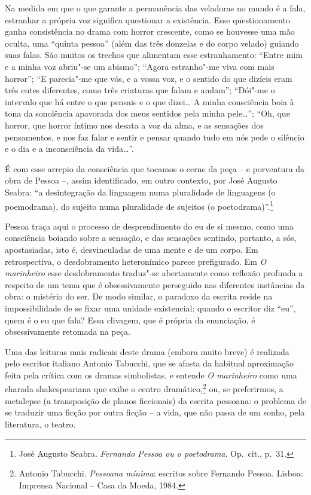 Na medida em que o que garante a 
permanência das veladoras no mundo é a
fala, estranhar a própria voz significa
questionar a existência. Esse
questionamento ganha consistência no
drama com horror crescente, como
se houvesse uma mão oculta, uma “quinta pessoa”
(além das três donzelas
e do corpo velado) guiando suas falas. 
São muitos os trechos que
alimentam esse estranhamento: 
“Entre mim e a minha voz abriu"-se um
abismo”; “Agora estranho"-me viva com
mais horror”; “E parecia"-me que
vós, e a vossa voz, e o sentido do que 
dizíeis eram três entes
diferentes, como três criaturas que
falam e andam”; “Dói"-me o intervalo
que há entre o que pensais e o que
dizei\ldots{} A minha consciência boia à
tona da sonolência apavorada dos meus 
sentidos pela minha pele\ldots{}”;
“Oh, que horror, que horror íntimo nos desata a voz da alma, e as
sensações dos pensamentos, e nos
faz falar e sentir e pensar quando
tudo em nós pede o silêncio e o dia
e a inconsciência da vida\ldots{}”. 

É com esse arrepio da consciência que tocamos 
o cerne da peça -- e
porventura da obra de Pessoa --, assim 
identificado, em outro contexto,
por José Augusto Seabra: “a desintegração
da linguagem numa pluralidade
de linguagens (o poemodrama), do sujeito
numa pluralidade de sujeitos
(o poetodrama)”.\footnote{ 
José Augusto Seabra. \textit{Fernando Pessoa
ou o poetodrama}. Op.~cit., p.~31.} 

Pessoa traça aqui o processo de desprendimento do eu de si mesmo, como
uma consciência boiando sobre a sensação, e das sensações sentindo,
portanto, a sós, apostasiadas, isto é, desvinculadas de uma mente e de
um corpo. Em retrospectiva, o desdobramento heteronímico parece
prefigurado. Em \textit{O marinheiro} esse desdobramento traduz"-se
abertamente como reflexão profunda a respeito de um tema que é
obsessivamente perseguido nas diferentes instâncias da obra: o mistério
do ser. De modo similar, o paradoxo da escrita reside na
impossibilidade de se fixar uma unidade existencial: quando o escritor
diz “eu”, quem é o eu que fala? Essa clivagem, que é própria da
enunciação, é obsessivamente retomada na peça.

Uma das leituras mais radicais deste drama (embora muito breve) é
realizada pelo escritor italiano Antonio Tabucchi, que se afasta da
habitual aproximação feita pela crítica com os dramas simbolistas, e
entende \textit{O marinheiro} como uma charada shakespeariana que exibe
o centro dramático,\footnote{ Antonio Tabucchi. \textit{Pessoana
mínima}: escritos sobre Fernando Pessoa. Lisboa: Imprensa Nacional --
Casa da Moeda, 1984.} ou, se preferirmos, a metalepse (a transposição
de planos ficcionais) da escrita pessoana: o problema de se traduzir
uma ficção por outra ficção -- a vida, que não passa de um sonho, pela
literatura, o teatro. 

